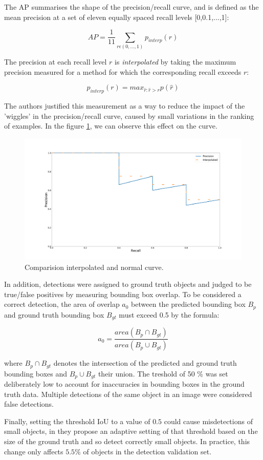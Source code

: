 The AP summarises the shape of the precision/recall curve, and is defined as the mean precision at a set of eleven equally spaced recall levels [0,0.1,...,1]:

$$ AP = \dfrac{1}{11} \sum_{r \epsilon (0,...,1)} p_{interp}(r) $$

The precision at each recall level $r$ is \textit{interpolated} by taking the maximum precision measured for a method for which the corresponding recall exceeds $r$:

$$ p_{interp}(r) = max_{\hat r: \hat r>r} p( \hat r)$$

The authors justified this measurement as a way to reduce the impact of the 'wiggles' in the precision/recall curve, caused by small variations in the ranking of examples. In the figure \ref{diagramaI}, we can observe this effect on the curve.

\begin{figure}[H]
\centering         
\includegraphics[width=0.7\linewidth]{evaluacionObject/interpol.png}
\caption{Comparision interpolated and normal curve.} \label{diagramaI}
\end{figure}


In addition, detections were assigned to ground truth objects and judged to be true/false positives by measuring bounding box overlap. To be considered a correct detection, the area of overlap $a_{0}$ between the predicted bounding box $B_{p}$ and ground truth bounding box $ B_{gt}$ must exceed 0.5 by the formula:


$$ a_{0} = \dfrac{area(B_{p} \cap B_{gt})}{area(B_{p} \cup B_{gt})} $$

where $B_{p} \cap B_{gt}$ denotes the intersection of the predicted and ground truth bounding boxes and $ B_{p} \cup B_{gt} $ their union. The treshold of 50 \%  was set deliberately low to account for inaccuracies in bounding boxes in the ground truth data. Multiple detections of the same object in an image were considered false detections.

Finally, setting the threshold IoU to a value of $0.5$ could cause misdetections of small objects, in \cite{imagenet} they propose an adaptive setting of that threshold based on the size of the ground truth and so detect correctly small objects. In practice, this change only affects $5.5\%$ of objects in the detection validation set.








